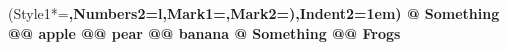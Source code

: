 \documentclass[preview]{standalone}
\begin{document}
\begin{center}
\begin{easylist}
  \ListProperties(Style1*=\bfseries,Numbers2=l,Mark1={},Mark2={)},Indent2=1em)
  @ Something
  @@ apple
  @@ pear
  @@ banana
  @ Something
  @@ Frogs
\end{easylist}
\end{center}
\end{document}
